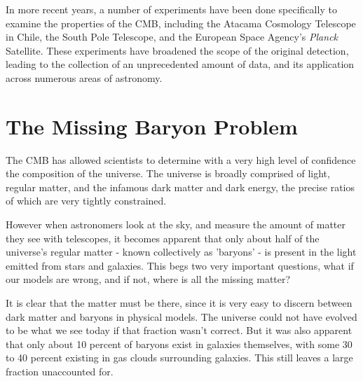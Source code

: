 \documentclass{article}
\begin{document}
In more recent years, a number of experiments have been done specifically to examine the properties of the CMB, including the Atacama Cosmology Telescope in Chile, the South Pole Telescope, and the European Space Agency's \textit{Planck} Satellite. These experiments have broadened the scope of the original detection, leading to the collection of an unprecedented amount of data, and its application across numerous areas of astronomy. 

\section{The Missing Baryon Problem}
The CMB has allowed scientists to determine with a very high level of confidence the composition of the universe. The universe is broadly comprised of light, regular matter, and the infamous dark matter and dark energy, the precise ratios of which are very tightly constrained. 

However when astronomers look at the sky, and measure the amount of matter they see with telescopes, it becomes apparent that only about half of the universe's regular matter - known collectively as 'baryons' - is present in the light emitted from stars and galaxies. This begs two very important questions, what if our models are wrong, and if not, where is all the missing matter? 

It is clear that the matter must be there, since it is very easy to discern between dark matter and baryons in physical models. The universe could not have evolved to be what we see today if that fraction wasn't correct. But it was also apparent that only about 10 percent of baryons exist in galaxies themselves, with some 30 to 40 percent existing in gas clouds surrounding galaxies. This still leaves a large fraction unaccounted for. 
\end{document}
